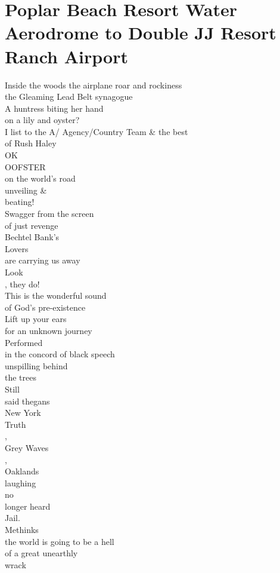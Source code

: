 \documentclass[smalldemyvopaper,11pt,twoside,onecolumn,openright,extrafontsizes]{memoir}
\begin{document}
\chapter{Poplar Beach Resort Water Aerodrome to Double JJ Resort Ranch Airport}
Inside the woods  the airplane roar and rockiness
\\the Gleaming Lead Belt synagogue
\\A huntress biting her hand
\\on a lily and oyster?
\\I list to the A/ Agency/Country Team \& the best
\\of Rush Haley
\\OK
\\OOFSTER
\\on the world's road
\\unveiling \&
\\beating!
\\Swagger from the screen
\\of just revenge
\\Bechtel Bank's
\\Lovers
\\are carrying us away
\\Look
\\, they do!
\\This is the wonderful sound
\\of God's pre-existence
\\Lift up your ears
\\for an unknown journey
\\Performed
\\in the concord of black speech
\\unspilling behind
\\the trees
\\Still
\\said thegans
\\New York
\\Truth
\\,
\\Grey Waves
\\,
\\Oaklands
\\laughing
\\no
\\longer heard
\\Jail.
\\Methinks
\\the world is going to be a hell
\\of a great unearthly
\\wrack
\end{document}
